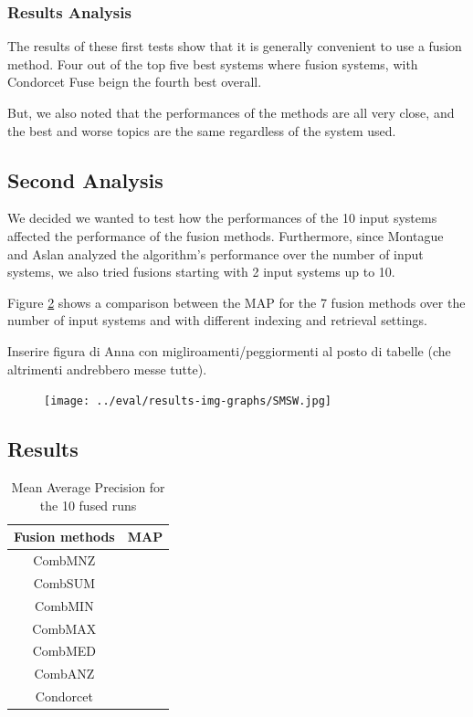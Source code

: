 	\subsubsection{Results Analysis}
	The results of these first tests show that it is generally convenient to use a fusion method.
	Four out of the top five best systems where fusion systems, with Condorcet Fuse beign the fourth best overall.
	
	But, we also noted that the performances of the methods are all very close, and the best and worse topics are the same regardless of the system used.
	
	\subsection{Second Analysis}
	We decided we wanted to test how the performances of the 10 input systems affected the performance of the fusion methods.
	Furthermore, since Montague and Aslan \cite{3} analyzed the algorithm's performance over the number of input systems, we also tried fusions starting with 2 input systems up to 10.
	
	Figure \hyperref[fig:SMSW]{2} shows a comparison between the MAP for the 7 fusion methods over the number of input systems and with different indexing and retrieval settings.
	
	Inserire figura di Anna con migliroamenti/peggiormenti al posto di tabelle (che altrimenti andrebbero messe tutte).
	
	\begin{figure}
		\centering				
		\texttt{[image: ../eval/results-img-graphs/SMSW.jpg]}
		\label{fig:SMSW}					
	\end{figure}
	
	

	    \subsection{Results}

		\begin{table}[H]
		    \centering
		    \begin{tabular}{c p{4cm}}
		    \toprule
		    \textbf{Fusion methods} & \textbf{MAP} \\ \toprule
		    CombMNZ &  \\ \hline
		    CombSUM &  \\ \hline
		    CombMIN &  \\ \hline
		    CombMAX &  \\ \hline
		    CombMED &  \\ \hline
		    CombANZ &  \\ \hline
			Condorcet &  \\ \bottomrule
		    \end{tabular}
		    \caption{Mean Average Precision for the 10 fused runs}
		\end{table}

